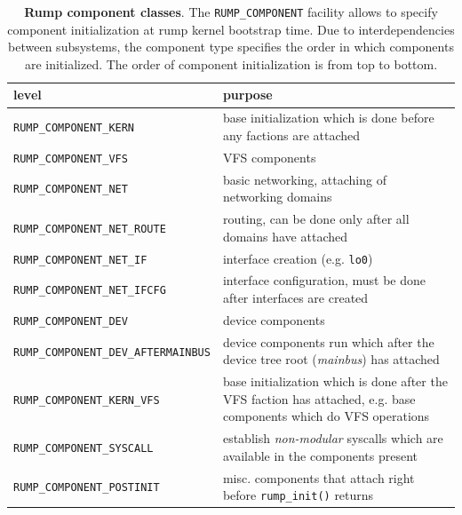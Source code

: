 \begin{table}
\begin{tabular}{|l|p{8cm}|}
\hline
level & purpose \\
\hline
\hline
\verb+RUMP_COMPONENT_KERN+ & base initialization which is done before
	any factions are attached \\
\hline
\verb+RUMP_COMPONENT_VFS+ & VFS components \\
\hline
\verb+RUMP_COMPONENT_NET+ & basic networking, attaching of networking domains \\
\hline
\verb+RUMP_COMPONENT_NET_ROUTE+ & routing, can be done only after all
	domains have attached \\
\hline
\verb+RUMP_COMPONENT_NET_IF+ & interface creation (e.g. \texttt{lo0}) \\
\hline
\verb+RUMP_COMPONENT_NET_IFCFG+ & interface configuration, must be done after
	interfaces are created \\
\hline
\verb+RUMP_COMPONENT_DEV+ & device components \\
\hline
\verb+RUMP_COMPONENT_DEV_AFTERMAINBUS+ & device components run which after
	the device tree root (\textit{mainbus}) has attached \\
\hline
\verb+RUMP_COMPONENT_KERN_VFS+ & base initialization which is done
	after the VFS faction has attached, e.g. base components which
	do VFS operations \\
\hline
\verb+RUMP_COMPONENT_SYSCALL+ & establish \textit{non-modular} syscalls
	which are available in the components present \\
\hline
\verb+RUMP_COMPONENT_POSTINIT+ & misc. components that attach right before
	\verb+rump_init()+ returns \\
\hline
\end{tabular}
\caption[Rump component classes]{
\textbf{Rump component classes}.
The \texttt{RUMP\_COMPONENT} facility allows to specify component
initialization at rump kernel bootstrap time.  Due to interdependencies
between subsystems, the component type specifies the order in which
components are initialized.  The order of component initialization is from top
to bottom.
}
\label{tab:compinit}
\end{table}

